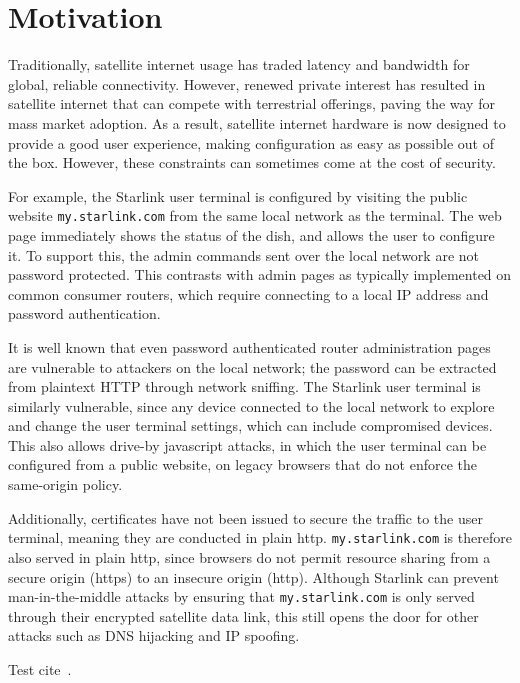 \section{Motivation}\label{sec:motivation}

Traditionally, satellite internet usage has traded latency and bandwidth for global, reliable connectivity.
However, renewed private interest has resulted in satellite internet that can compete with terrestrial offerings, paving the way for mass market adoption.
As a result, satellite internet hardware is now designed to provide a good user experience, making configuration as easy as possible out of the box.
However, these constraints can sometimes come at the cost of security.

For example, the Starlink user terminal is configured by visiting the public website \texttt{my.starlink.com} from the same local network as the terminal.
The web page immediately shows the status of the dish, and allows the user to configure it.
To support this, the admin commands sent over the local network are not password protected.
This contrasts with admin pages as typically implemented on common consumer routers, which require connecting to a local IP address and password authentication.

It is well known that even password authenticated router administration pages are vulnerable to attackers on the local network; the password can be extracted from plaintext HTTP through network sniffing.
The Starlink user terminal is similarly vulnerable, since any device connected to the local network to explore and change the user terminal settings, which can include compromised devices.
This also allows drive-by javascript attacks, in which the user terminal can be configured from a public website, on legacy browsers that do not enforce the same-origin policy.

Additionally, certificates have not been issued to secure the traffic to the user terminal, meaning they are conducted in plain http.
\texttt{my.starlink.com} is therefore also served in plain http, since browsers do not permit resource sharing from a secure origin (https) to an insecure origin (http).
Although Starlink can prevent man-in-the-middle attacks by ensuring that \texttt{my.starlink.com} is only served through their encrypted satellite data link, this still opens the door for other attacks such as DNS hijacking and IP spoofing.



Test cite~\cite{roccaUnderstanding2021}.
